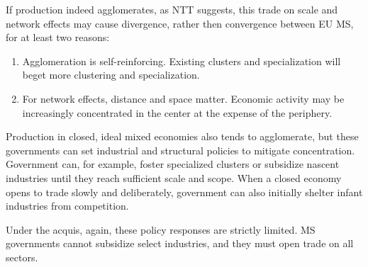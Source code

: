 \documentclass[11pt,a4paper,oneside,openright]{article}
\begin{document}
If production indeed agglomerates, as \gls{NTT} suggests, this trade on scale and network effects may cause divergence, rather then convergence between \gls{EU} \gls{MS}, for at least two reasons:
\begin{enumerate}
	\item Agglomeration is self-reinforcing. Existing clusters and specialization will beget more clustering and specialization. 
	\item For network effects, distance and space matter. Economic activity may be increasingly concentrated in the center at the expense of the periphery.
\end{enumerate}

Production in closed, ideal mixed economies also tends to agglomerate, but these governments can set industrial and structural policies to mitigate concentration. Government can, for example, foster specialized clusters or subsidize nascent industries until they reach sufficient scale and scope. When a closed economy opens to trade slowly and deliberately, government can also initially shelter infant industries from competition.

Under the acquis, again, these policy responses are strictly limited. \gls{MS} governments cannot subsidize select industries, and they must open trade on all sectors.
\end{document}
